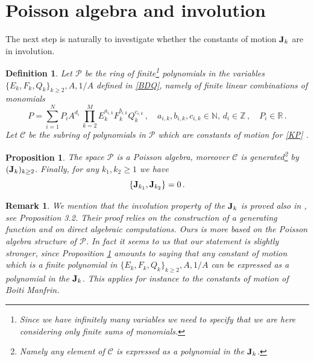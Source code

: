 \documentclass[reqno,11pt]{amsart}
\theoremstyle{plain}
\numberwithin{equation}{section}
\newtheorem{proposition}[theorem]{Proposition}
\newtheorem{remark}[theorem]{Remark}
\newtheorem{definition}[theorem]{Definition}
\newcommand{\R}{\mathbb{R}}
\newcommand{\N}{\mathbb{N}}
\newcommand{\Z}{\mathbb{Z}}
\newcommand{\T}{\mathbb{T}}
\newcommand{\I}{{\texttt{\bf J}}}
\newcommand{\J}{{\texttt{\bf J}}}
\newcommand{\red}[1]{\textcolor{red}{#1}}
\begin{document}
{\section{Poisson algebra and involution}
The next step is naturally to investigate whether the constants of motion $\I_k$ are in involution. 
\begin{definition}
	Let $\mathscr{P}$ be the ring of finite\footnote{Since we have infinitely many variables we need to specify that we are here considering only finite sums of monomials.}  polynomials in the variables $\{E_k,F_k,Q_k\}_{k\geq 2}, A ,1/A$ defined in \eqref{BDQ}, namely of finite linear combinations of monomials
	\[
	P = \sum_{i=1}^N P_i A^{d_i}\,\prod_{k=2}^M E_k^{a_{i,k}} F_k^{b_{i,k}} Q_k^{c_{i,k}} \,,\quad a_{i,k},b_{i,k},c_{i,k}\in \N,\,d_i\in \Z\,,\quad  P_i\in \R\,.
	\]
	Let $\mathscr C$ be the subring of polynomials in $\mathscr P$ which are constants of motion for \eqref{KP}
	.\end{definition}

%
\begin{proposition}\label{involuz}
	The space $\mathscr{P}$ is a Poisson algebra, moreover $\mathscr{C}$ is generated\footnote{Namely any element of $\mathscr{C}$ is expressed as a polynomial in the $\J_k$.}  by  $(\I_k)_{k\geq 2}$.
	Finally, for any $k_1,k_2\geq 1$ we have 
	\[
	\{\I_{k_1},\I_{k_2}\} =0\,.
	\]
\end{proposition}
\begin{remark}
	We mention that the involution property of the $\I_k$ is proved also in \cite{campos}, see Proposition 3.2. Their proof relies on the construction of a generating function and on direct algebraic computations. Ours is more based on the Poisson algebra structure of $\mathscr{P}$. In fact it seems to us that our statement is slightly stronger, since Proposition \ref{involuz} amounts to saying that any constant of motion which is a finite polynomial in $\{E_k,F_k,Q_k\}_{k\geq 2}, A ,1/A$ can be expressed as a polynomial in the $\I_k$. This applies for instance to the  constants of motion of Boiti Manfrin.
\end{remark}


}
\end{document}
